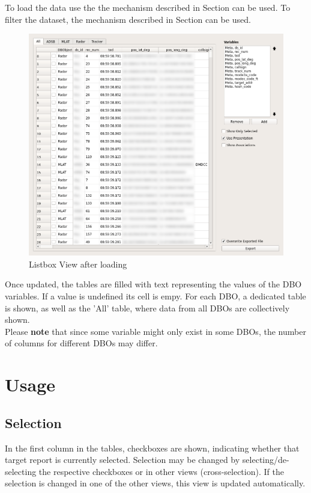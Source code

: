 To load the data use the the mechanism described in Section  can be used. To filter the dataset, the mechanism described in Section  can be used.

\begin{figure}[H]
    \hspace*{-2cm}
    \includegraphics[width=18cm,frame]{../screenshots/listbox_loaded.png}
  \caption{Listbox View after loading}
  \label{fig:listbox_load}
\end{figure}

Once updated, the tables are filled with text representing the values of the DBO variables.  If a value is undefined its cell is empy. For each DBO, a dedicated table is shown, as well as the 'All' table, where data from all DBOs are collectively shown. \\

Please \textbf{note} that since some variable might only exist in some DBOs, the number of columns for different DBOs may differ. \\


\section{Usage}

\subsection{Selection}
In the first column in the tables, checkboxes are shown, indicating whether that target report is currently selected. Selection may be changed by selecting/de-selecting the respective checkboxes or in other views (cross-selection). If the selection is changed in one of the other views, this view is updated automatically.


